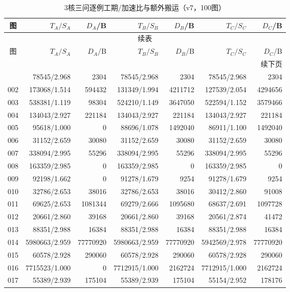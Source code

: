 \begin{longtable}{crrrrrr}
\caption{3核三问逐例工期/加速比与额外搬运（v7，100图）}\label{tab:detail-3}\\
\toprule
图 & $T_A/S_A$ & $D_A$/B & $T_B/S_B$ & $D_B$/B & $T_C/S_C$ & $D_C$/B \\
\midrule
\endfirsthead
\multicolumn{7}{c}{续表}\\
\toprule
图 & $T_A/S_A$ & $D_A$/B & $T_B/S_B$ & $D_B$/B & $T_C/S_C$ & $D_C$/B \\
\midrule
\endhead
\midrule\multicolumn{7}{r}{续下页}\\
\endfoot
\bottomrule
\endlastfoot
001 & 78545/2.968 & 2304 & 78545/2.968 & 2304 & 78545/2.968 & 2304 \\
002 & 173068/1.514 & 594432 & 131349/1.994 & 4211712 & 127539/2.054 & 4294656 \\
003 & 538381/1.119 & 98304 & 524210/1.149 & 3647050 & 522594/1.152 & 3579466 \\
004 & 134043/2.927 & 221184 & 134043/2.927 & 221184 & 134043/2.927 & 221184 \\
005 & 95618/1.000 & 0 & 88696/1.078 & 1492040 & 86911/1.100 & 1492040 \\
006 & 31152/2.659 & 30080 & 31152/2.659 & 30080 & 31152/2.659 & 30080 \\
007 & 338094/2.995 & 55296 & 338094/2.995 & 55296 & 338094/2.995 & 55296 \\
008 & 163359/2.985 & 0 & 163359/2.985 & 0 & 163359/2.985 & 0 \\
009 & 92198/1.662 & 0 & 91278/1.679 & 9254 & 91278/1.679 & 9254 \\
010 & 32786/2.653 & 38016 & 32786/2.653 & 38016 & 30412/2.860 & 91008 \\
011 & 69625/2.653 & 1081344 & 69279/2.666 & 1095680 & 68637/2.691 & 1097728 \\
012 & 20661/2.860 & 39168 & 20661/2.860 & 39168 & 20561/2.874 & 41472 \\
013 & 88351/2.988 & 16384 & 88351/2.988 & 16384 & 88351/2.988 & 16384 \\
014 & 5980663/2.959 & 77770920 & 5980663/2.959 & 77770920 & 5942569/2.978 & 77770920 \\
015 & 60578/2.928 & 290060 & 60578/2.928 & 290060 & 60578/2.928 & 290060 \\
016 & 7715523/1.000 & 0 & 7712915/1.000 & 2162724 & 7712915/1.000 & 2162724 \\
017 & 55389/2.939 & 175104 & 55389/2.939 & 175104 & 55154/2.952 & 178176 \\

\end{longtable}
